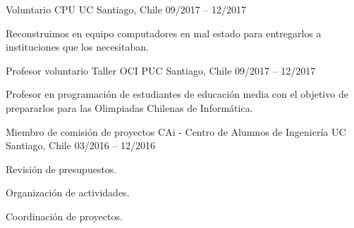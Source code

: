 \begin{cventries}
  \cventry
    {Voluntario} %
    {CPU UC} %
    {Santiago, Chile} %
    {09/2017 – 12/2017} %
    {
      \begin{cvitems} %
        \item {Reconstruimos en equipo computadores en mal estado para entregarlos a instituciones que los necesitaban.}
      \end{cvitems}
    }

  \cventry
    {Profesor voluntario} %
    {Taller OCI PUC} %
    {Santiago, Chile} %
    {09/2017 – 12/2017} %
    {
      \begin{cvitems} %
        \item {Profesor en programación de estudiantes de educación media con el objetivo de prepararlos para las Olimpiadas Chilenas de Informática.}
      \end{cvitems}
    }

\cventry
  {Miembro de comisión de proyectos} %
  {CAi - Centro de Alumnos de Ingeniería UC} %
  {Santiago, Chile} %
  {03/2016 – 12/2016} %
  {
    \begin{cvitems} %
      \item {Revisión de presupuestos.}
      \item {Organización de actividades.}
      \item {Coordinación de proyectos.}
    \end{cvitems}
  }

\end{cventries}
